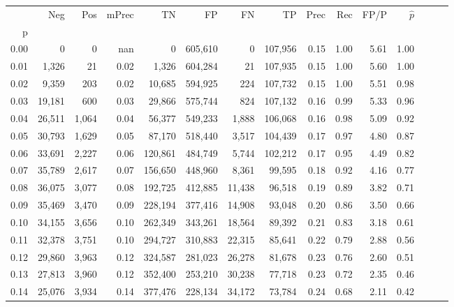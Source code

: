 \begin{tabular}{rrrrrrrrrrrrrrr}
\toprule
{} &     Neg &    Pos & mPrec &       TN &       FP &       FN &       TP &  Prec &   Rec &  FP/P & $\hat{p}$ \\
p    &         &        &       &          &          &          &          &       &       &       &           \\
\midrule
0.00 &       0 &      0 &   nan &        0 &  605,610 &        0 &  107,956 &  0.15 &  1.00 &  5.61 &      1.00 \\
0.01 &   1,326 &     21 &  0.02 &    1,326 &  604,284 &       21 &  107,935 &  0.15 &  1.00 &  5.60 &      1.00 \\
0.02 &   9,359 &    203 &  0.02 &   10,685 &  594,925 &      224 &  107,732 &  0.15 &  1.00 &  5.51 &      0.98 \\
0.03 &  19,181 &    600 &  0.03 &   29,866 &  575,744 &      824 &  107,132 &  0.16 &  0.99 &  5.33 &      0.96 \\
0.04 &  26,511 &  1,064 &  0.04 &   56,377 &  549,233 &    1,888 &  106,068 &  0.16 &  0.98 &  5.09 &      0.92 \\
0.05 &  30,793 &  1,629 &  0.05 &   87,170 &  518,440 &    3,517 &  104,439 &  0.17 &  0.97 &  4.80 &      0.87 \\
0.06 &  33,691 &  2,227 &  0.06 &  120,861 &  484,749 &    5,744 &  102,212 &  0.17 &  0.95 &  4.49 &      0.82 \\
0.07 &  35,789 &  2,617 &  0.07 &  156,650 &  448,960 &    8,361 &   99,595 &  0.18 &  0.92 &  4.16 &      0.77 \\
0.08 &  36,075 &  3,077 &  0.08 &  192,725 &  412,885 &   11,438 &   96,518 &  0.19 &  0.89 &  3.82 &      0.71 \\
0.09 &  35,469 &  3,470 &  0.09 &  228,194 &  377,416 &   14,908 &   93,048 &  0.20 &  0.86 &  3.50 &      0.66 \\
0.10 &  34,155 &  3,656 &  0.10 &  262,349 &  343,261 &   18,564 &   89,392 &  0.21 &  0.83 &  3.18 &      0.61 \\
0.11 &  32,378 &  3,751 &  0.10 &  294,727 &  310,883 &   22,315 &   85,641 &  0.22 &  0.79 &  2.88 &      0.56 \\
0.12 &  29,860 &  3,963 &  0.12 &  324,587 &  281,023 &   26,278 &   81,678 &  0.23 &  0.76 &  2.60 &      0.51 \\
0.13 &  27,813 &  3,960 &  0.12 &  352,400 &  253,210 &   30,238 &   77,718 &  0.23 &  0.72 &  2.35 &      0.46 \\
0.14 &  25,076 &  3,934 &  0.14 &  377,476 &  228,134 &   34,172 &   73,784 &  0.24 &  0.68 &  2.11 &      0.42 \\

\end{tabular}
